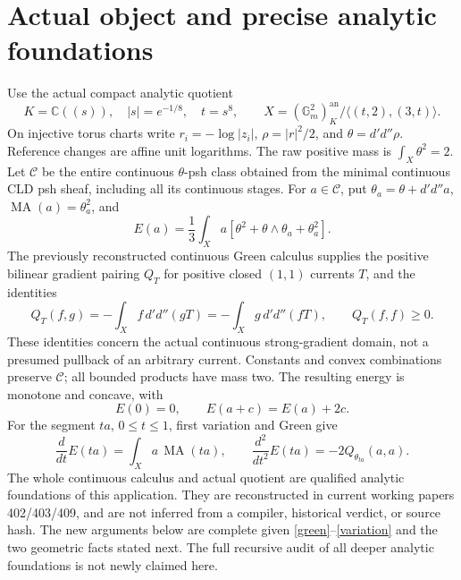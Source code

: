 \documentclass[11pt]{article}
\newcommand{\C}{\mathcal C}
\newcommand{\MA}{\operatorname{MA}}
\newcommand{\DD}{d'd''}
\begin{document}
\section{Actual object and precise analytic foundations}
Use the actual compact analytic quotient
\[
 K=\mathbb C((s)),\quad |s|=e^{-1/8},\quad t=s^8,
 \qquad X=(\mathbb G_m^2)^{\mathrm{an}}_K/
                    \langle(t,2),(3,t)\rangle.
\]
On injective torus charts write $r_i=-\log|z_i|$,
$\rho=|r|^2/2$, and $\theta=\DD\rho$. Reference changes are
affine unit logarithms. The raw positive mass is $\int_X\theta^2=2$.
Let $\C$ be the entire continuous $\theta$-psh class obtained from the
minimal continuous CLD psh sheaf, including all its continuous stages.
For $a\in\C$, put $\theta_a=\theta+\DD a$,
$\MA(a)=\theta_a^2$, and
\[
 E(a)=\frac13\int_X a[\theta^2+\theta\wedge\theta_a+\theta_a^2].
\]
The previously reconstructed continuous Green calculus supplies the
positive bilinear gradient pairing $Q_T$ for positive closed $(1,1)$
currents $T$, and the identities
\begin{equation}\label{green}
 Q_T(f,g)=-\int_X f\,\DD(gT)=-\int_X g\,\DD(fT),
 \qquad Q_T(f,f)\ge0.
\end{equation}
These identities concern the actual continuous strong-gradient domain,
not a presumed pullback of an arbitrary current. Constants and convex
combinations preserve $\C$; all bounded products have mass two.
The resulting energy is monotone and concave, with
\begin{equation}\label{translation}
 E(0)=0,\qquad E(a+c)=E(a)+2c.
\end{equation}
For the segment $ta$, $0\le t\le1$, first variation and Green give
\begin{equation}\label{variation}
 \frac{d}{dt}E(ta)=\int_X a\,\MA(ta),\qquad
 \frac{d^2}{dt^2}E(ta)=-2Q_{\theta_{ta}}(a,a).
\end{equation}
The whole continuous calculus and actual quotient are qualified analytic
foundations of this application. They are reconstructed in current
working papers 402/403/409, and are not inferred from a compiler,
historical verdict, or source hash. The new arguments below are complete
given \eqref{green}--\eqref{variation} and the two geometric facts stated
next. The full recursive audit of all deeper analytic foundations is
not newly claimed here.
\end{document}
